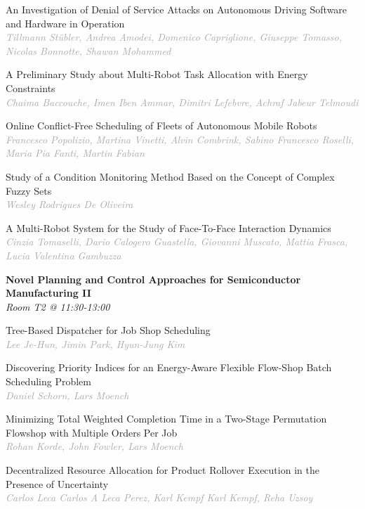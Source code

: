 \begin{multicols*}{2}
\small An Investigation of Denial of Service Attacks on Autonomous Driving Software and Hardware in Operation\\ 
\footnotesize \textcolor{darkgray}{\textit{Tillmann Stübler, Andrea  Amodei, Domenico  Capriglione, Giuseppe  Tomasso, Nicolas  Bonnotte, Shawan  Mohammed}}

\small A Preliminary Study about Multi-Robot Task Allocation with Energy Constraints\\ 
\footnotesize \textcolor{darkgray}{\textit{Chaima Baccouche, Imen  Iben Ammar, Dimitri  Lefebvre, Achraf Jabeur  Telmoudi}}

\small Online Conflict-Free Scheduling of Fleets of Autonomous Mobile Robots\\ 
\footnotesize \textcolor{darkgray}{\textit{Francesco Popolizio, Martina  Vinetti, Alvin  Combrink, Sabino Francesco  Roselli, Maria Pia  Fanti, Martin  Fabian}}

\small Study of a Condition Monitoring Method Based on the Concept of Complex Fuzzy Sets\\ 
\footnotesize \textcolor{darkgray}{\textit{Wesley Rodrigues De Oliveira}}

\small A Multi-Robot System for the Study of Face-To-Face Interaction Dynamics\\ 
\footnotesize \textcolor{darkgray}{\textit{Cinzia Tomaselli, Dario Calogero  Guastella, Giovanni  Muscato, Mattia  Frasca, Lucia Valentina  Gambuzza}}

\normalsize \textbf{Novel Planning and Control Approaches for Semiconductor Manufacturing II}\\
\small \textit{Room T2 @ 11:30-13:00}

\small Tree-Based Dispatcher for Job Shop Scheduling\\ 
\footnotesize \textcolor{darkgray}{\textit{Lee Je-Hun, Jimin  Park, Hyun-Jung  Kim}}

\small Discovering Priority Indices for an Energy-Aware Flexible Flow-Shop Batch Scheduling Problem\\ 
\footnotesize \textcolor{darkgray}{\textit{Daniel Schorn, Lars  Moench}}

\small Minimizing Total Weighted Completion Time in a Two-Stage Permutation Flowshop with Multiple Orders Per Job\\ 
\footnotesize \textcolor{darkgray}{\textit{Rohan Korde, John  Fowler, Lars  Moench}}

\small Decentralized Resource Allocation for Product Rollover Execution in the Presence of Uncertainty\\ 
\footnotesize \textcolor{darkgray}{\textit{Carlos Leca Carlos A Leca Perez, Karl Kempf  Karl Kempf, Reha  Uzsoy}}


\end{multicols*}
